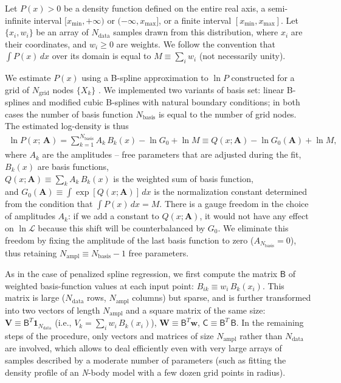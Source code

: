 \documentclass[12pt]{article}
\newcommand{\Nbody}{\textsl{N}-body\xspace}
\newcommand{\bA}{\boldsymbol{A}}
\begin{document}
Let $P(x)>0$ be a density function defined on the entire real axis, a semi-infinite interval $[x_\mathrm{min},+\infty)$ or $(-\infty,x_\mathrm{max}]$, or a finite interval $[x_\mathrm{min},x_\mathrm{max}]$.
Let $\{x_i, w_i\}$ be an array of $N_\mathrm{data}$ samples drawn from this distribution, where $x_i$ are their coordinates, and $w_i\ge 0$ are weights. We follow the convention that $\int P(x)\,dx$ over its domain is equal to $M\equiv \sum_i w_i$ (not necessarily unity).

We estimate $P(x)$ using a B-spline approximation to $\ln P$ constructed for a grid of $N_\mathrm{grid}$ nodes $\{X_k\}$ \cite{OSullivan1988}. We implemented two variants of basis set: linear B-splines and modified cubic B-splines with natural boundary conditions; in both cases the number of basis function $N_\mathrm{basis}$ is equal to the number of grid nodes. The estimated log-density is thus
\begin{align}
\ln P(x;\,\bA) = \sum_{k=1}^{N_\mathrm{basis}}  A_k\, B_k(x) - \ln G_0 + \ln M \equiv Q(x; \bA) - \ln G_0(\bA) + \ln M ,
\end{align}
where $A_k$ are the amplitudes -- free parameters that are adjusted during the fit,\\
$B_k(x)$  are  basis functions,\\
$Q(x; \bA) \equiv \sum_k  A_k\, B_k(x)$  is the weighted sum of basis function, \\
and $G_0(\bA) \equiv \int \exp[Q(x; \bA)]\, dx$  is the normalization constant determined from the condition that $\int P(x)\,dx = M$.
There is a gauge freedom in the choice of amplitudes $A_k$: if we add a constant to $Q(x; \bA)$, it would not have any effect on $\ln\mathcal{L}$ because this shift will be counterbalanced by $G_0$. We eliminate this freedom by fixing the amplitude of the last basis function to zero ($A_{N_\mathrm{basis}}=0$), thus retaining $N_\mathrm{ampl}\equiv N_\mathrm{basis}-1$ free parameters.

As in the case of penalized spline regression, we first compute the matrix $\mathsf{B}$ of weighted basis-function values at each input point: $B_{ik} \equiv w_i\,B_k(x_i)$. This matrix is large ($N_\mathrm{data}$ rows, $N_\mathrm{ampl}$ columns) but sparse, and is further transformed into two vectors of length $N_\mathrm{ampl}$ and a square matrix of the same size:
$\boldsymbol{V} \equiv \mathsf{B}^T\boldsymbol{1}_{N_\mathrm{data}}$ (i.e., $V_k = \sum_i w_i\,B_k(x_i)$), $\boldsymbol{W} \equiv \mathsf{B}^T\boldsymbol{w}$, $\mathsf{C} \equiv \mathsf{B}^T\,\mathsf{B}$. In the remaining steps of the procedure, only vectors and matrices of size $N_\mathrm{ampl}$ rather than $N_\mathrm{data}$ are involved, which allows to deal efficiently even with very large arrays of samples described by a moderate number of parameters (such as fitting the density profile of an \Nbody model with a few dozen grid points in radius).
\end{document}
